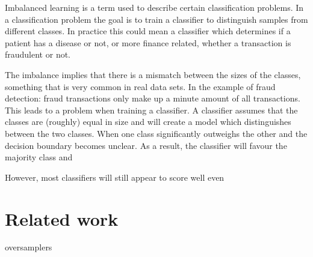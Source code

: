
Imbalanced learning is a term used to describe certain classification problems. In a classification problem the goal is to train a classifier to distinguish samples from different classes. In practice this could mean a classifier which determines if a patient has a disease or not, or more finance related, whether a transaction is fraudulent or not.

The imbalance implies that there is a mismatch between the sizes of the classes, something that is very common in real data sets. In the example of fraud detection: fraud transactions only make up a minute amount of all transactions. This leads to a problem when training a classifier. A classifier assumes that the classes are (roughly) equal in size and will create a model which distinguishes between the two classes. When one class significantly outweighs the other and the decision boundary becomes unclear. As a result, the classifier will favour the majority class and 

However, most classifiers will still appear to score well even 

\section{Related work}

oversamplers